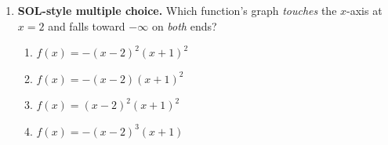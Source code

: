 \documentclass[10pt]{article}
\begin{document}
\begin{enumerate}[leftmargin=1.8em, itemsep=10pt]
    \vspace{3pt}
    (b) Skeleton: $f(x) = a\,($\blank{1.6cm}$)($\blank{1.6cm}$)^2$ \quad Solve for $a$:
    $a = $ \blank{1.2cm}

    \vspace{3pt}
    (c) A possible equation: \blank{5.0cm}

    \vspace{3pt}
    (d) Does this function have an absolute maximum? \blank{1.2cm} \; Explain in one sentence.
    \blank{5.6cm}

  \item \textbf{SOL-style multiple choice.} Which function's graph \emph{touches} the $x$-axis at
    $x=2$ and falls toward $-\infty$ on \emph{both} ends?
    \begin{enumerate}[label=\Alph*., leftmargin=1.9em, itemsep=1pt]
      \item $f(x) = -(x-2)^2(x+1)^2$
      \item $f(x) = -(x-2)(x+1)^2$
      \item $f(x) = (x-2)^2(x+1)^2$
      \item $f(x) = -(x-2)^3(x+1)$
    \end{enumerate}
\end{enumerate}
\end{document}
